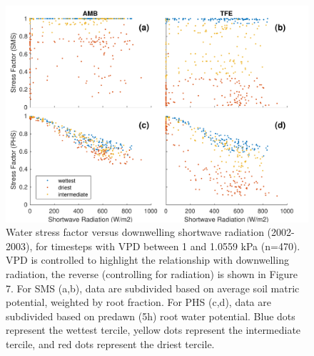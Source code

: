 \documentclass[draft]{agujournal}
\begin{document}
      \begin{figure}[h]
     \centering
     \includegraphics[width=30pc]{figs/suppstress.pdf}
     \caption{Water stress factor versus downwelling shortwave radiation (2002-2003), for timesteps with VPD between 1 and 1.0559 kPa (n=470).
     VPD is controlled to highlight the relationship with downwelling radiation, the reverse (controlling for radiation) is shown in Figure 7.
     For SMS (a,b), data are subdivided based on average soil matric potential, weighted by root fraction.
     For PHS (c,d), data are subdivided based on predawn (5h) root water potential.
     Blue dots represent the wettest tercile, yellow dots represent the intermediate tercile, and red dots represent the driest tercile.
     }
     \label{supp:fsds}
       \end{figure}
         \clearpage
\end{document}
